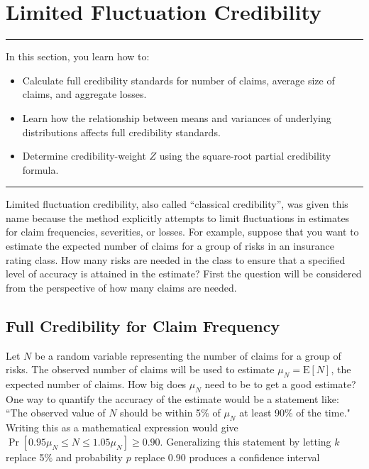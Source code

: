 \documentclass[]{book}
\providecommand{\tightlist}{%
  \setlength{\itemsep}{0pt}\setlength{\parskip}{0pt}}
\theoremstyle{definition}
\theoremstyle{definition}
\theoremstyle{definition}
\theoremstyle{remark}
\begin{document}
\section{Limited Fluctuation
Credibility}\label{limited-fluctuation-credibility}

\begin{center}\rule{0.5\linewidth}{\linethickness}\end{center}

In this section, you learn how to:

\begin{itemize}
\tightlist
\item
  Calculate full credibility standards for number of claims, average
  size of claims, and aggregate losses.
\item
  Learn how the relationship between means and variances of underlying
  distributions affects full credibility standards.
\item
  Determine credibility-weight \(Z\) using the square-root partial
  credibility formula.
\end{itemize}

\begin{center}\rule{0.5\linewidth}{\linethickness}\end{center}

Limited fluctuation credibility, also called ``classical credibility'',
was given this name because the method explicitly attempts to limit
fluctuations in estimates for claim frequencies, severities, or losses.
For example, suppose that you want to estimate the expected number of
claims for a group of risks in an insurance rating class. How many risks
are needed in the class to ensure that a specified level of accuracy is
attained in the estimate? First the question will be considered from the
perspective of how many claims are needed.

\subsection{Full Credibility for Claim Frequency}\label{S:frequency}

Let \(N\) be a random variable representing the number of claims for a
group of risks. The observed number of claims will be used to estimate
\(\mu_N=\mathrm{E}[N]\), the expected number of claims. How big does
\(\mu_N\) need to be to get a good estimate? One way to quantify the
accuracy of the estimate would be a statement like: ``The observed value
of \(N\) should be within 5\(\%\) of \(\mu_N\) at least 90\(\%\) of the
time." Writing this as a mathematical expression would give
\(\Pr[0.95\mu_N\leq N \leq1.05\mu_N] \geq 0.90\). Generalizing this
statement by letting \(k\) replace 5\(\%\) and probability \(p\) replace
0.90 produces a confidence interval
\end{document}
